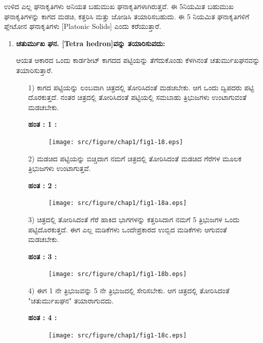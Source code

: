 \smallskip

ಉಳಿದ ಎಲ್ಲ ಘನಾಕೃತಿಗಳು ಅನಿಯತ ಬಹುಮುಖ ಘನಾಕೃತಿಗಳಾಗಿರುತ್ತವೆ. ಈ 5\break ನಿಯಮಿತ ಬಹುಮುಖ ಘನಾಕೃತಿಗಳನ್ನು ಕಾಗದ ಮಡಚಿ, ಕತ್ತರಿಸಿ ಮತ್ತು ಜೋಡಿಸಿ ತಯಾರಿಸಬಹುದು. ಈ  5 ನಿಯಮಿತ ಘನಾಕೃತಿಗಳಿಗೆ ಪ್ಲೇಟೋನ ಘನಾಕೃತಿಗಳು [Platonic Solids] ಎಂದು ಕರೆಯುತ್ತಾರೆ. 
\begin{enumerate}
\item \textbf{ಚತುರ್ಮುಖ ಘನ. [Tetra hedron]ವನ್ನು ತಯಾರಿಸುವದು:} 

ಆಯತ ಆಕಾರದ ಒಂದು ಕಾರ್ಡಶೀಟ್ ಕಾಗದದ ಪಟ್ಟಿಯನ್ನು ತೆಗೆದುಕೊಂಡು ಕೆಳಗಿನಂತೆ ಚತುರ್ಮುಖಘನವನ್ನು ತಯಾರಿಸುತ್ತಾರೆ. 
\begin{itemize}
\item[1)] ಕಾಗದ ಪಟ್ಟಿಯನ್ನು ಲಂಬವಾಗಿ ಚಿತ್ರದಲ್ಲಿ ತೋರಿಸಿದಂತೆ ಮಡಚಬೇಕು. ಆಗ ಒಂದು ದ್ವಿಪದರು ಪಟ್ಟಿ ದೊರಕುತ್ತದೆ. ನಂತರ ಚಿತ್ರದಲ್ಲಿ ತೋರಿಸಿದಂತೆ ಪಟ್ಟಿಯಲ್ಲಿ ಸಮಬಾಹು ತ್ರಿಭುಜಗಳು ಉಂಟಾಗುವಂತೆ ಮಡಚಬೇಕು. 

\eject


\noindent
\textbf{ಹಂತ : 1 :}
\begin{figure}[H]
\centering
\texttt{[image: src/figure/chap1/fig1-18.eps]}
\end{figure}

\item[2)]  ಮಡಚಿದ ಪಟ್ಟಿಯನ್ನು ಬಿಚ್ಚಿದಾಗ ನಮಗೆ ಚಿತ್ರದಲ್ಲಿ ತೋರಿಸಿದಂತೆ ಮಡಚಿದ ಗೆರೆಗಳ ಮೂಲಕ ತ್ರಿಭುಜಗಳು ಉಂಟಾಗುತ್ತವೆ. 

\noindent
\textbf{ಹಂತ : 2 :}
\begin{figure}[H]
\centering
\texttt{[image: src/figure/chap1/fig1-18a.eps]}
\end{figure}

\item[3)]  ಚಿತ್ರದಲ್ಲಿ ತೋರಿಸಿದಂತೆ ಗೆರೆ ಹಾಕಿದ ಭಾಗಗಳನ್ನು ಕತ್ತರಿಸಿದಾಗ ನಮಗೆ 5 ತ್ರಿಭುಜಗಳ ಒಂದು ಪಟ್ಟಿದೊರಕುತ್ತದೆ. ಈಗ ಎಲ್ಲ ಮಡಿಕೆಗಳು ಒಂದೇ\break ಪ್ರಕಾರದ ಉಬ್ಬಿದ ಮಡಿಕೆಗಳು ಆಗುವಂತೆ ಮಡಚಬೇಕು.

\noindent
\textbf{ಹಂತ : 3 :}
\begin{figure}[H]
\centering
\texttt{[image: src/figure/chap1/fig1-18b.eps]}
\end{figure}

\item[4)]  ಈಗ 1 ನೇ ತ್ರಿಭುಜವನ್ನು 5 ನೇ ತ್ರಿಭುಜದಲ್ಲಿ ಸೇರಿಸಬೇಕು. ಆಗ ಚಿತ್ರದಲ್ಲಿ ತೋರಿಸಿದಂತೆ "ಚತುರ್ಮುಖಘನ" ತಯಾರಾಗುವದು. 

\eject

\noindent
\textbf{ಹಂತ : 4 :}
\begin{figure}[H]
\centering
\texttt{[image: src/figure/chap1/fig1-18c.eps]}\\
\end{figure}
\end{itemize}


\end{enumerate}

